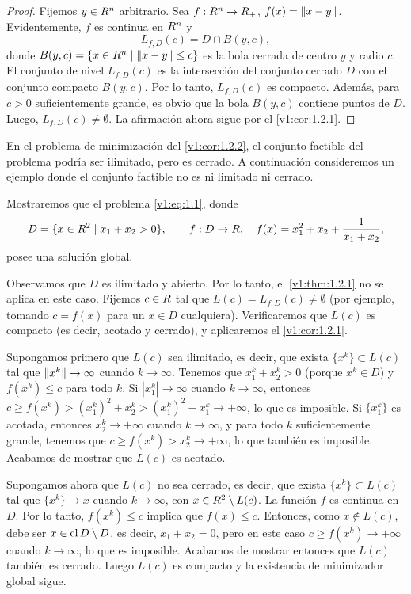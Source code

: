 \begin{proof}
    Fijemos $y \in R^n$ arbitrario. Sea $f : R^n \to R_+$, $f(x) = \lVert x - y\rVert$. Evidentemente, $f$ es continua en $R^n$ y
    \[
        L_{f,D}(c) = D \cap B(y,c),
    \]
    donde $B(y,c) = \{x \in R^n \mid \lVert x - y\rVert \le c\}$ es la bola cerrada de centro $y$ y radio $c$. El conjunto de nivel $L_{f,D}(c)$ es la intersección del conjunto cerrado $D$ con el conjunto compacto $B(y,c)$. Por lo tanto, $L_{f,D}(c)$ es compacto. Además, para $c > 0$ suficientemente grande, es obvio que la bola $B(y,c)$ contiene puntos de $D$. Luego, $L_{f,D}(c) \neq \emptyset$. La afirmación ahora sigue por el \cref{v1:cor:1.2.1}.
\end{proof}

En el problema de minimización del \cref{v1:cor:1.2.2}, el conjunto factible del problema podría ser ilimitado, pero es cerrado. A continuación consideremos un ejemplo donde el conjunto factible no es ni limitado ni cerrado.

\begin{example}\label{v1:exa:1.2.1}
    Mostraremos que el problema \eqref{v1:eq:1.1}, donde
    \[
        D = \{x \in R^2 \mid x_1 + x_2 > 0\}, \qquad
        f : D \to R, \quad f(x) = x_1^2 + x_2 + \frac{1}{x_1 + x_2},
    \]
    posee una solución global.

    Observamos que $D$ es ilimitado y abierto. Por lo tanto, el \cref{v1:thm:1.2.1} no se aplica en este caso. Fijemos $c \in R$ tal que $L(c) = L_{f,D}(c) \neq \emptyset$ (por ejemplo, tomando $c = f(x)$ para un $x \in D$ cualquiera). Verificaremos que $L(c)$ es compacto (es decir, acotado y cerrado), y aplicaremos el \cref{v1:cor:1.2.1}.

    Supongamos primero que $L(c)$ sea ilimitado, es decir, que exista $\{x^k\} \subset L(c)$ tal que $\lVert x^k\rVert \to \infty$ cuando $k \to \infty$. Tenemos que $x_1^k + x_2^k > 0$ (porque $x^k \in D$) y $f(x^k) \le c$ para todo $k$. Si $|x_1^k| \to \infty$ cuando $k \to \infty$, entonces $c \ge f(x^k) > (x_1^k)^2 + x_2^k > (x_1^k)^2 - x_1^k \to +\infty$, lo que es imposible. Si $\{x_1^k\}$ es acotada, entonces $x_2^k \to +\infty$ cuando $k \to \infty$, y para todo $k$ suficientemente grande, tenemos que $c \ge f(x^k) > x_2^k \to +\infty$, lo que también es imposible. Acabamos de mostrar que $L(c)$ es acotado.

    Supongamos ahora que $L(c)$ no sea cerrado, es decir, que exista $\{x^k\} \subset L(c)$ tal que $\{x^k\} \to x$ cuando $k \to \infty$, con $x \in R^2 \setminus L(c)$. La función $f$ es continua en $D$. Por lo tanto, $f(x^k) \le c$ implica que $f(x) \le c$. Entonces, como $x \notin L(c)$, debe ser $x \in \operatorname{cl} D \setminus D$, es decir, $x_1 + x_2 = 0$, pero en este caso $c \ge f(x^k) \to +\infty$ cuando $k \to \infty$, lo que es imposible. Acabamos de mostrar entonces que $L(c)$ también es cerrado. Luego $L(c)$ es compacto y la existencia de minimizador global sigue.
\end{example}

